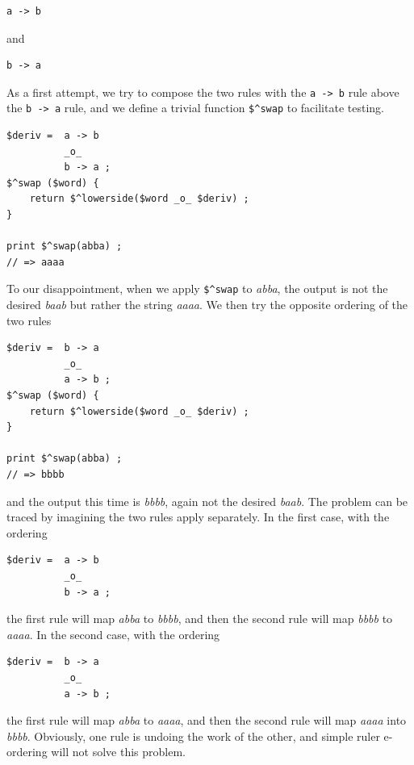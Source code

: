 \begin{Verbatim}
a -> b 
\end{Verbatim}

\noindent
and

\begin{Verbatim}
b -> a
\end{Verbatim}

As a first attempt, we try to compose the two rules with the \verb!a -> b! rule above the
\verb!b -> a! rule, and we define a trivial function \verb!$^swap! to facilitate testing.


\begin{Verbatim}
$deriv =  a -> b
          _o_
          b -> a ;
$^swap ($word) { 
    return $^lowerside($word _o_ $deriv) ;
}

print $^swap(abba) ;
// => aaaa
\end{Verbatim}

\noindent
To our disappointment, when we apply \verb!$^swap! to \emph{abba}, the output is not the desired
\emph{baab} but rather the string \emph{aaaa}.  We then try the opposite ordering of the
two rules

\begin{Verbatim}
$deriv =  b -> a
          _o_
          a -> b ;
$^swap ($word) { 
    return $^lowerside($word _o_ $deriv) ;
}

print $^swap(abba) ;
// => bbbb
\end{Verbatim}

\noindent
and the output this time is \emph{bbbb}, again not the desired \emph{baab}.  The problem
can be traced by imagining the two rules apply separately.  In the first case, with the
ordering


\begin{Verbatim}
$deriv =  a -> b
          _o_
          b -> a ;
\end{Verbatim}

\noindent
the first rule will map \emph{abba} to \emph{bbbb}, and then the second rule will map
\emph{bbbb} to \emph{aaaa}.  In the second case, with the ordering


\begin{Verbatim}
$deriv =  b -> a
          _o_
          a -> b ;
\end{Verbatim}

\noindent
the first rule will map \emph{abba} to \emph{aaaa}, and then the second rule will map
\emph{aaaa} into \emph{bbbb}.  Obviously, one rule is undoing the work
of the other, and simple ruler e-ordering will not solve this
problem.


